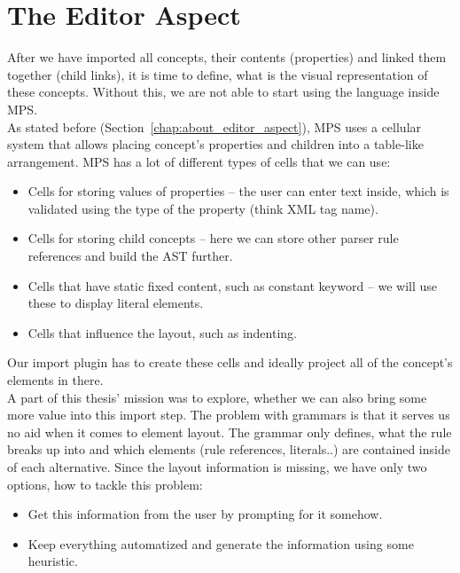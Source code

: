 \section{The Editor Aspect}
\label{chap:editor_aspect}

After we have imported all concepts, their contents (properties) and linked them together (child links), it is time to define, what is the visual representation of these concepts.
Without this, we are not able to start using the language inside MPS.
\\

As stated before (Section~\ref{chap:about_editor_aspect}), MPS uses a cellular system that allows placing concept's properties and children into a table-like arrangement.
MPS has a lot of different types of cells that we can use:

\begin{itemize}
	\item Cells for storing values of properties -- the user can enter text inside, which is validated using the type of the property (think XML tag name).

	\item Cells for storing child concepts -- here we can store other parser rule references and build the AST further.

	\item Cells that have static fixed content, such as constant keyword -- we will use these to display literal elements.

	\item Cells that influence the layout, such as indenting.
\end{itemize}

Our import plugin has to create these cells and ideally project all of the concept's elements in there.
\\

A part of this thesis' mission was to explore, whether we can also bring some more value into this import step.
The problem with grammars is that it serves us no aid when it comes to element layout.
The grammar only defines, what the rule breaks up into and which elements (rule references, literals..) are contained inside of each alternative.
Since the layout information is missing, we have only two options, how to tackle this problem:

\begin{itemize}
	\item Get this information from the user by prompting for it somehow.
	\item Keep everything automatized and generate the information using some heuristic.
\end{itemize}

